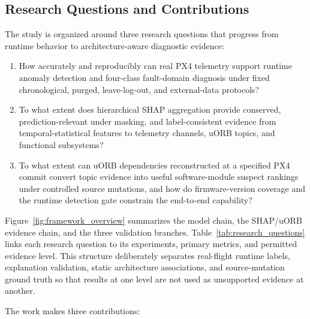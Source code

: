 \subsection{Research Questions and Contributions}

The study is organized around three research questions that progress from runtime behavior to architecture-aware diagnostic evidence:

\begin{enumerate}[label=\textbf{RQ\arabic*.},leftmargin=1.35cm,labelwidth=0.95cm,labelsep=0.15cm]
    \item How accurately and reproducibly can real PX4 telemetry support runtime anomaly detection and four-class fault-domain diagnosis under fixed chronological, purged, leave-log-out, and external-data protocols?
    \item To what extent does hierarchical SHAP aggregation provide conserved, prediction-relevant under masking, and label-consistent evidence from temporal-statistical features to telemetry channels, uORB topics, and functional subsystems?
    \item To what extent can uORB dependencies reconstructed at a specified PX4 commit convert topic evidence into useful software-module suspect rankings under controlled source mutations, and how do firmware-version coverage and the runtime detection gate constrain the end-to-end capability?
\end{enumerate}

Figure~\ref{fig:framework_overview} summarizes the model chain, the SHAP/uORB evidence chain, and the three validation branches. Table~\ref{tab:research_questions} links each research question to its experiments, primary metrics, and permitted evidence level. This structure deliberately separates real-flight runtime labels, explanation validation, static architecture associations, and source-mutation ground truth so that results at one level are not used as unsupported evidence at another.

The work makes three contributions:

